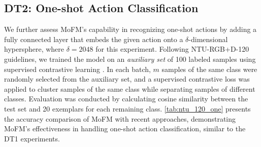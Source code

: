 \subsection{DT2: One-shot Action Classification}\label{sec:dt2}
We further assess MoFM's capability in recognizing one-shot actions by adding a fully connected layer that embeds the given action onto a $\delta$-dimensional hypersphere, where $\delta = 2048$ for this experiment. Following NTU-RGB+D-120 \cite{ntu120paper} guidelines, we trained the model on an \textit{auxiliary set} of 100 labeled samples using supervised contrastive learning \cite{khosla2020supervised}. In each batch, \( m \) samples of the same class were randomly selected from the auxiliary set, and a supervised contrastive loss was applied to cluster samples of the same class while separating samples of different classes. Evaluation was conducted by calculating cosine similarity between the test set and 20 exemplars for each remaining class. \cref{tab:ntu_120_one} presents the accuracy comparison of MoFM with recent approaches, demonstrating MoFM's effectiveness in handling one-shot action classification, similar to the DT1 experiments.







